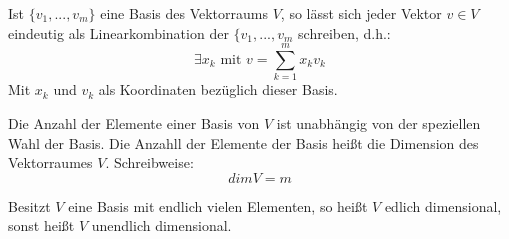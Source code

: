      \begin{definition}
		  \glqq Ist $\lbrace v_1,...,v_m \rbrace$ eine Basis des Vektorraums $V$, so lässt sich jeder Vektor $v \in V$ eindeutig als Linearkombination der $\lbrace               
		    v_1,...,v_m$ schreiben, d.h.:
		    \begin{equation}
		      \exists x_k \text{ mit } v = \sum_{k=1}^m x_k v_k
		    \end{equation}
		    \grqq \cite{HM12}\newline
		    Mit $x_k$ und $v_k$ als Koordinaten bezüglich dieser Basis.
	    \end{definition}
	    
	    \begin{definition}
		    \glqq Die Anzahl der Elemente einer Basis von $V$ ist unabhängig von der speziellen Wahl der Basis. Die Anzahll der Elemente der Basis heißt die Dimension des Vektorraumes $V$.\grqq \cite{HM12} Schreibweise:
		    \begin{equation}
		      dim V = m
		    \end{equation}
		   \end{definition}
		   
		   \begin{definition}
		     \glqq Besitzt $V$ eine Basis mit endlich vielen Elementen, so heißt $V$ edlich dimensional, sonst heißt $V$ unendlich dimensional. \grqq \cite{HM12}
		   \end{definition}
		   
